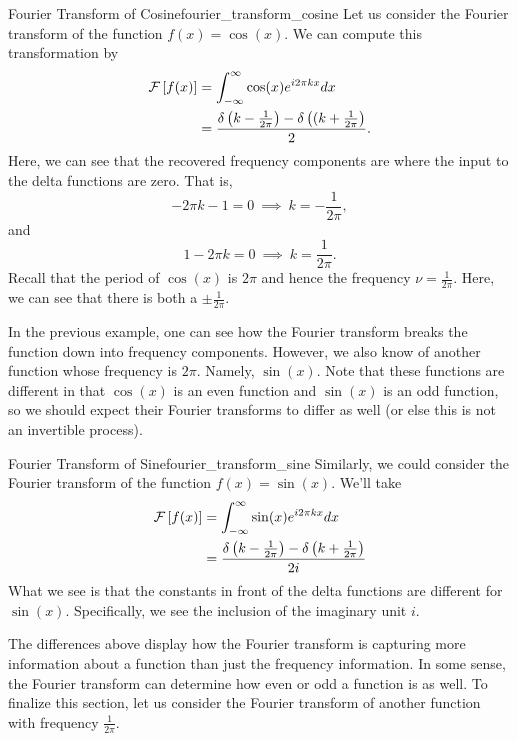 \begin{ex}{Fourier Transform of Cosine}{fourier_transform_cosine}
	Let us consider the Fourier transform of the function $f(x)=\cos(x)$.  We can compute this transformation by
	\begin{align*}
	\mathcal{F}\left[ f(x) \right] &= \int_{-\infty}^\infty \cos(x)e^{i2\pi kx}dx\\
	&= \frac{\delta\left(k-\frac{1}{2\pi}\right)-\delta\left((k+\frac{1}{2\pi}\right)}{2}.
	\end{align*}
	Here, we can see that the recovered frequency components are where the input to the delta functions are zero. That is,
	\[
	-2\pi k -1 = 0~ \implies ~k= -\frac{1}{2\pi},
	\]
	and
	\[
	1-2\pi k = 0~ \implies ~k=\frac{1}{2\pi}.
	\]
	Recall that the period of $\cos(x)$ is $2\pi$ and hence the frequency $\nu = \frac{1}{2\pi}$. Here, we can see that there is both a $\pm \frac{1}{2 \pi}$.
\end{ex}

In the previous example, one can see how the Fourier transform breaks the function down into frequency components. However, we also know of another function whose frequency is $2\pi$. Namely, $\sin(x)$. Note that these functions are different in that $\cos(x)$ is an even function and $\sin(x)$ is an odd function, so we should expect their Fourier transforms to differ as well (or else this is not an invertible process).

\begin{ex}{Fourier Transform of Sine}{fourier_transform_sine}
	Similarly, we could consider the Fourier transform of the function $f(x)=\sin(x)$.  We'll take
	\begin{align*}
		\mathcal{F}\left[ f(x) \right] &= \int_{-\infty}^\infty \sin(x) e^{i2\pi kx} dx\\
		&= \frac{\delta\left(k-\frac{1}{2\pi}\right)-\delta\left(k+\frac{1}{2\pi}\right)}{2i}
	\end{align*}
	What we see is that the constants in front of the delta functions are different for $\sin(x)$. Specifically, we see the inclusion of the imaginary unit $i$. 
\end{ex}

The differences above display how the Fourier transform is capturing more information about a function than just the frequency information. In some sense, the Fourier transform can determine how even or odd a function is as well.  To finalize this section, let us consider the Fourier transform of another function with frequency $\frac{1}{2\pi}$.

